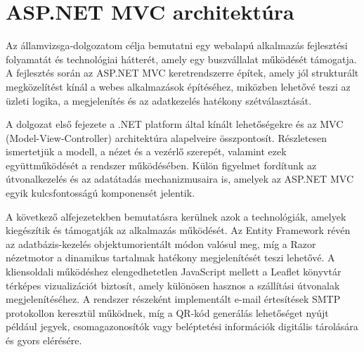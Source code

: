 \section{ASP.NET MVC architektúra}

\indent Az államvizsga-dolgozatom célja bemutatni egy webalapú alkalmazás fejlesztési folyamatát és technológiai hátterét, amely egy buszvállalat működését támogatja. A fejlesztés során az ASP.NET MVC keretrendszerre építek, amely jól strukturált megközelítést kínál a webes alkalmazások építéséhez, miközben lehetővé teszi az üzleti logika, a megjelenítés és az adatkezelés hatékony szétválasztását.

A dolgozat első fejezete a .NET platform által kínált lehetőségekre és az MVC (Model-View-Controller) architektúra alapelveire összpontosít. Részletesen ismertetjük a modell, a nézet és a vezérlő szerepét, valamint ezek együttműködését a rendszer működésében. Külön figyelmet fordítunk az útvonalkezelés és az adatátadás mechanizmusaira is, amelyek az ASP.NET MVC egyik kulcsfontosságú komponensét jelentik.

A következő alfejezetekben bemutatásra kerülnek azok a technológiák, amelyek kiegészítik és támogatják az alkalmazás működését. Az Entity Framework révén az adatbázis-kezelés objektumorientált módon valósul meg, míg a Razor nézetmotor a dinamikus tartalmak hatékony megjelenítését teszi lehetővé. A kliensoldali működéshez elengedhetetlen JavaScript mellett a Leaflet könyvtár térképes vizualizációt biztosít, amely különösen hasznos a szállítási útvonalak megjelenítéséhez. A rendszer részeként implementált e-mail értesítések SMTP protokollon keresztül működnek, míg a QR-kód generálás lehetőséget nyújt például jegyek, csomagazonosítók vagy beléptetési információk digitális tárolására és gyors elérésére.

